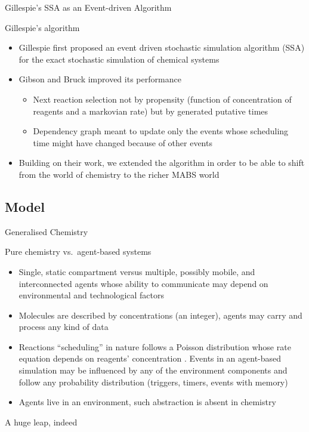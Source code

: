 \documentclass[presentation]{beamer} %
\begin{document}
\begin{frame}{Gillespie's SSA as an Event-driven Algorithm}
  \begin{block}{Gillespie's algorithm}
    \begin{itemize}
      \item Gillespie first proposed an event driven stochastic simulation algorithm (SSA) for the exact stochastic simulation of chemical systems
      \item Gibson and Bruck \cite{gibson2000} improved its performance
      \begin{itemize}
	\item Next reaction selection not by propensity (function of concentration of reagents and a markovian rate) but by generated putative times
	\item Dependency graph meant to update only the events whose scheduling time might have changed because of other events
      \end{itemize}
      \item Building on their work, we extended the algorithm in order to be able to shift from the world of chemistry to the richer MABS world
    \end{itemize}
  \end{block}
\end{frame}

\subsection{Model}
\begin{frame}{Generalised Chemistry}
\begin{block}{Pure chemistry vs.\ agent-based systems}
\begin{itemize}
 \item Single, static compartment versus multiple, possibly mobile, and interconnected agents whose ability to communicate may depend on environmental and technological factors
 \item Molecules are described by concentrations (an integer), agents may carry and process any kind of data
 \item Reactions ``scheduling'' in nature follows a Poisson distribution whose rate equation depends on reagents' concentration \cite{gillespie1977}. Events in an agent-based simulation may be influenced by any of the environment components and follow any probability distribution (triggers, timers, events with memory)
 \item Agents live in an environment, such abstraction is absent in chemistry
\end{itemize}
\end{block}
\begin{center}A huge leap, indeed\end{center}
\end{frame}
\end{document}
